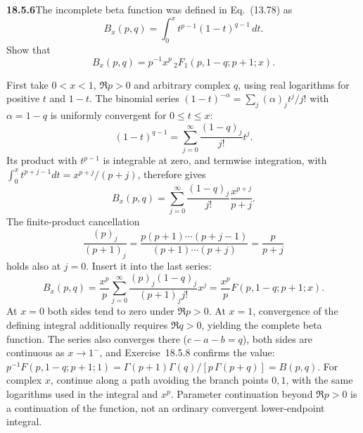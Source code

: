 \par\bigskip
\noindent\textbf{18.5.6}\quad The incomplete beta function was
defined in Eq.~(13.78) as
\[
B_{x}(p,q)=\int_{0}^{x}t^{p-1}(1-t)^{q-1}\,dt.
\]
Show that
\[
B_{x}(p,q)=p^{-1}x^{p}\,{}_{2}F_{1}(p,1-q;p+1;x).
\]
\par\nobreak
\solution
First take $0<x<1$, $\Re p>0$ and arbitrary complex $q$, using
real logarithms for positive $t$ and $1-t$.
The binomial series $(1-t)^{-\alpha}=\sum_j(\alpha)_jt^j/j!$ with
$\alpha=1-q$ is uniformly convergent for $0\le t\le x$:
\[
(1-t)^{q-1}=\sum_{j=0}^\infty\frac{(1-q)_j}{j!}t^j.
\]
Its product with $t^{p-1}$ is integrable at zero, and termwise
integration, with $\int_0^xt^{p+j-1}dt=x^{p+j}/(p+j)$, therefore
gives
\[
B_x(p,q)=\sum_{j=0}^\infty
 \frac{(1-q)_j}{j!}\frac{x^{p+j}}{p+j}.
\]
The finite-product cancellation
\[
\frac{(p)_j}{(p+1)_j}=\frac{p(p+1)\cdots(p+j-1)}{(p+1)\cdots(p+j)}
=\frac{p}{p+j}
\]
holds also at $j=0$.  Insert it into the last series:
\[
\boxed{B_x(p,q)=\frac{x^p}{p}
 \sum_{j=0}^\infty\frac{(p)_j(1-q)_j}{(p+1)_j j!}x^j
 =\frac{x^p}{p}F(p,1-q;p+1;x)}.
\]
At $x=0$ both sides tend to zero under $\Re p>0$.
At $x=1$, convergence of the defining integral additionally requires
$\Re q>0$, yielding the complete beta function.  The series also
converges there ($c-a-b=q$), both sides are continuous as
$x\to1^-$, and Exercise~18.5.8 confirms the value:
$p^{-1}F(p,1-q;p+1;1)=\Gamma(p+1)\Gamma(q)/[p\,\Gamma(p+q)]=B(p,q)$.
For complex $x$, continue along a path avoiding the branch points
$0,1$, with the same logarithms used in the integral and $x^p$.
Parameter continuation beyond $\Re p>0$ is a continuation of the
function, not an ordinary convergent lower-endpoint integral.

